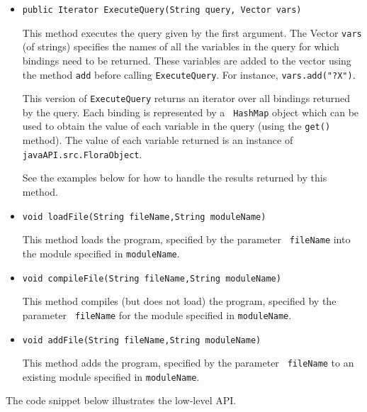 \begin{itemize}
\item
\begin{verbatim}
public Iterator ExecuteQuery(String query, Vector vars)
\end{verbatim}
  This method executes the \FLORA query given by the first argument. The
  Vector {\tt vars} (of strings) specifies the names of all the variables
  in the query for which bindings need to be returned. These variables are
  added to the vector using the method {\tt add} before calling
  {\tt ExecuteQuery}. For instance, {\tt vars.add("?X")}.  
  
  This version of {\tt ExecuteQuery} returns an iterator over all bindings
  returned by the \FLORA query.  Each binding is represented by a {\tt
    HashMap} 
  object which can be used to obtain the value of each variable in the
  query (using the {\tt get()} method). The value of each variable returned
  is an instance of {\tt
    javaAPI.src.FloraObject}.

  See the examples below for how to handle the results
  returned by this method.

\item
\begin{verbatim}
void loadFile(String fileName,String moduleName)
\end{verbatim}
  This method loads the \FLORA program, specified by the parameter {\tt
    fileName} into the \FLORA module specified in {\tt moduleName}.
\item
\begin{verbatim}
void compileFile(String fileName,String moduleName)
\end{verbatim}
  This method compiles (but does not load)
  the \FLORA program, specified by the parameter {\tt
    fileName} for the \FLORA module specified in {\tt moduleName}.
\item
\begin{verbatim}
void addFile(String fileName,String moduleName)
\end{verbatim}
  This method adds the \FLORA program, specified by the parameter {\tt
    fileName} to an existing \FLORA module specified in {\tt moduleName}.
\end{itemize}

The code snippet below illustrates the low-level API.

